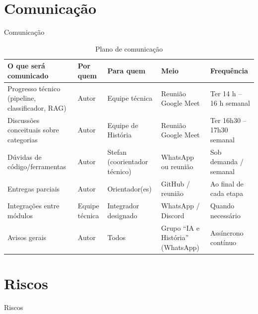 \section{\textbf{Comunicação}}{Comunicação}\label{comunicauxe7uxe3o}

\begin{table}[htbp]
  \small
  \caption{Plano de comunicação}                  %
  \label{tab:comunicacao}
  \centering
  \begin{tabularx}{\linewidth}{@{}>{\RaggedRight\arraybackslash}p{4.8cm}
                                    >{\RaggedRight\arraybackslash}p{1.6cm}
                                    >{\RaggedRight\arraybackslash}p{2.4cm}
                                    >{\RaggedRight\arraybackslash}p{2.8cm}
                                    >{\RaggedRight\arraybackslash}X@{}}
    \toprule
    O que será comunicado & Por quem & Para quem & Meio & Frequência \\ \midrule
    Progresso técnico (pipeline, classificador, RAG) & Autor & Equipe técnica & Reunião Google Meet & Ter 14 h – 16 h semanal \\[2pt]
    Discussões conceituais sobre categorias & Autor & Equipe de História & Reunião Google Meet & Ter 16h30 – 17h30 semanal \\[2pt]
    Dúvidas de código/ferramentas & Autor & Stefan (coorientador técnico) & WhatsApp ou reunião & Sob demanda / semanal \\[2pt]
    Entregas parciais & Autor & Orientador(es) & GitHub / reunião & Ao final de cada etapa \\[2pt]
    Integrações entre módulos & Equipe técnica & Integrador designado & WhatsApp / Discord & Quando necessário \\[2pt]
    Avisos gerais & Autor & Todos & Grupo “IA e História” (WhatsApp) & Assíncrono contínuo \\ \bottomrule
  \end{tabularx}
\end{table}

\section{\textbf{Riscos}}{Riscos}\label{riscos}

